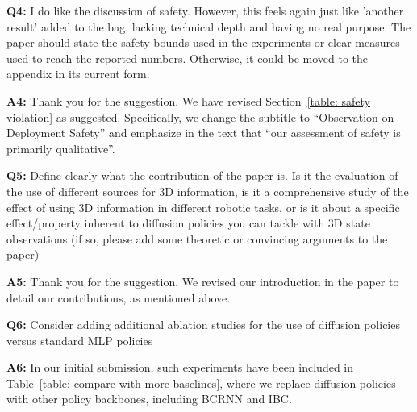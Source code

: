 \vspace{0.1in}

\noindent\textbf{Q4:} I do like the discussion of safety. However, this feels again just like 'another result' added to the bag, lacking technical depth and having no real purpose. The paper should state the safety bounds used in the experiments or clear measures used to reach the reported numbers. Otherwise, it could be moved to the appendix in its current form.

\noindent\textbf{A4:} Thank you for the suggestion. We have revised Section~\ref{table: safety violation} as suggested. Specifically, we change the subtitle to “Observation on Deployment Safety” and emphasize in the text that “our assessment of safety is primarily qualitative”.


\vspace{0.1in}

\noindent\textbf{Q5:} Define clearly what the contribution of the paper is. Is it the evaluation of the use of different sources for 3D information, is it a comprehensive study of the effect of using 3D information in different robotic tasks, or is it about a specific effect/property inherent to diffusion policies you can tackle with 3D state observations (if so, please add some theoretic or convincing arguments to the paper)

\noindent\textbf{A5:} Thank you for the suggestion. We revised our introduction in the paper to detail our contributions, as mentioned above.

\vspace{0.1in}

\noindent\textbf{Q6:} Consider adding additional ablation studies for the use of diffusion policies versus standard MLP policies

\noindent\textbf{A6:} In our initial submission, such experiments have been included in Table~\ref{table: compare with more baselines}, where we replace diffusion policies with other policy backbones, including BCRNN and IBC.


\clearpage